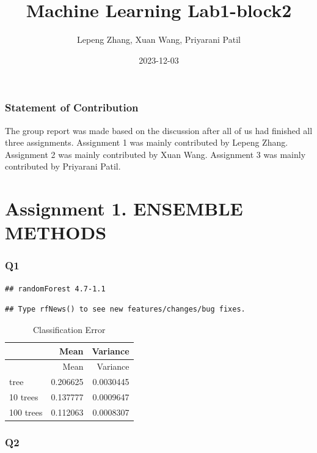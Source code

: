 \documentclass[
]{article}
\title{Machine Learning Lab1-block2}
\author{Lepeng Zhang, Xuan Wang, Priyarani Patil}
\date{2023-12-03}
\begin{document}
\maketitle

\hypertarget{statement-of-contribution}{%
\subsubsection{Statement of
Contribution}\label{statement-of-contribution}}

The group report was made based on the discussion after all of us had
finished all three assignments. Assignment 1 was mainly contributed by
Lepeng Zhang. Assignment 2 was mainly contributed by Xuan Wang.
Assignment 3 was mainly contributed by Priyarani Patil.

\hypertarget{assignment-1.-ensemble-methods}{%
\section{Assignment 1. ENSEMBLE
METHODS}\label{assignment-1.-ensemble-methods}}

\hypertarget{q1}{%
\subsubsection{Q1}\label{q1}}

\begin{verbatim}
## randomForest 4.7-1.1
\end{verbatim}

\begin{verbatim}
## Type rfNews() to see new features/changes/bug fixes.
\end{verbatim}

\begin{longtable}[]{@{}lrr@{}}
\caption{Classification Error}\tabularnewline
\toprule\noalign{}
& Mean & Variance \\
\midrule\noalign{}
\endfirsthead
\toprule\noalign{}
& Mean & Variance \\
\midrule\noalign{}
\endhead
\bottomrule\noalign{}
\endlastfoot
1 tree & 0.206625 & 0.0030445 \\
10 trees & 0.137777 & 0.0009647 \\
100 trees & 0.112063 & 0.0008307 \\
\end{longtable}

\hypertarget{q2}{%
\subsubsection{Q2}\label{q2}}
\end{document}
